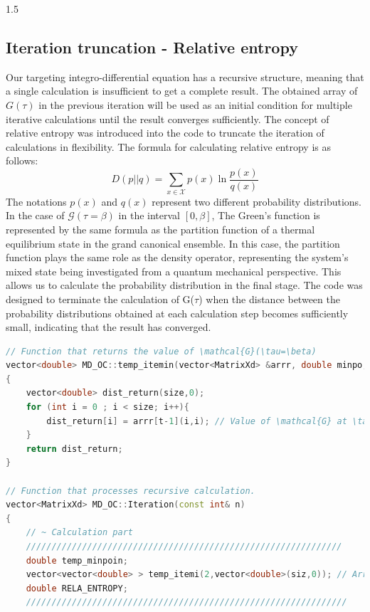 \documentclass{article}[12pt]
\numberwithin{equation}{section}
\begin{document}
\begin{spacing}{1.5}
\subsection{Iteration truncation - Relative entropy}
Our targeting integro-differential equation has a recursive structure, meaning that a single calculation is insufficient to get a complete result. The obtained array of $G(\tau)$ in the previous iteration will be used as an initial condition for multiple iterative calculations until the result converges sufficiently. The concept of relative entropy was introduced into the code to truncate the iteration of calculations in flexibility. The formula for calculating relative entropy is as follows:
\begin{equation*}
D(p||q) = \sum_{x\in\mathcal{X}}p(x)\ln\frac{p(x)}{q(x)}
\end{equation*}
The notations $p(x)$ and $q(x)$ represent two different probability distributions.
In the case of $\mathcal{G}(\tau = \beta)$ in the interval $[0,\beta]$, The Green's function is represented by the same formula as the partition function of a thermal equilibrium state in the grand canonical ensemble. In this case, the partition function plays the same role as the density operator, representing the system's mixed state being investigated from a quantum mechanical perspective.
This allows us to calculate the probability distribution in the final stage. The code was designed to terminate the calculation of G($\tau$) when the distance between the probability distributions obtained at each calculation step becomes sufficiently small, indicating that the result has converged.
\begin{lstlisting}[language=C++, caption=Iteration truncation code]
// Function that returns the value of \mathcal{G}(\tau=\beta)
vector<double> MD_OC::temp_itemin(vector<MatrixXd> &arrr, double minpo, int size)
{
    vector<double> dist_return(size,0);
    for (int i = 0 ; i < size; i++){
        dist_return[i] = arrr[t-1](i,i); // Value of \mathcal{G} at \tau = \beta
    }
    return dist_return;
}

// Function that processes recursive calculation.
vector<MatrixXd> MD_OC::Iteration(const int& n)
{
    // ~ Calculation part
    //////////////////////////////////////////////////////////////
    double temp_minpoin;
    vector<vector<double> > temp_itemi(2,vector<double>(siz,0)); // Arrays to store the results of the previous and current iteration. siz represents the dimension of the calculated square matrix.
    double RELA_ENTROPY;
    ///////////////////////////////////////////////////////////////
    

\end{lstlisting}
\end{spacing}
\end{document}
